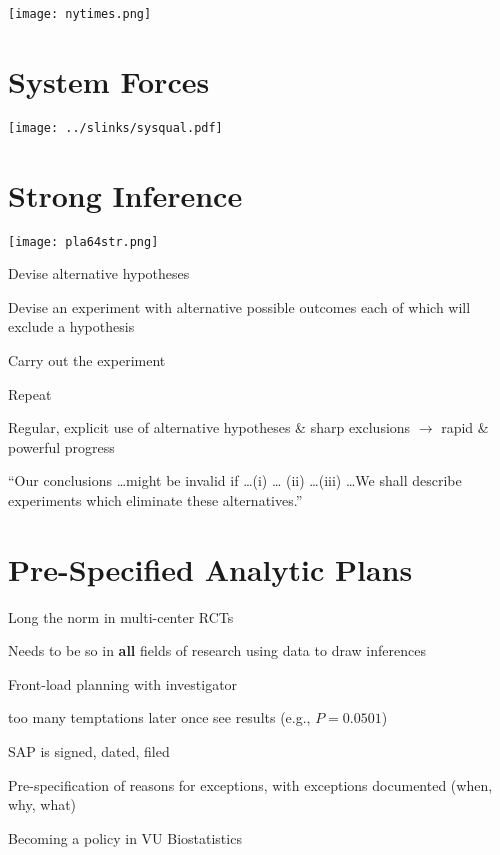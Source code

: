 \texttt{[image: nytimes.png]}

\section{System Forces}
\texttt{[image: ../slinks/sysqual.pdf]}

\section{Strong Inference}

\texttt{[image: pla64str.png]}

\citet{pla64str}

\bi
\item Devise alternative hypotheses
\item Devise an experiment with alternative possible outcomes each of
which will exclude a hypothesis
\item Carry out the experiment
\item Repeat
\item Regular, explicit use of alternative hypotheses \& sharp
exclusions $\rightarrow$ rapid \& powerful progress
\item ``Our conclusions \ldots might be invalid if \ldots (i) \ldots
(ii) \ldots (iii) \ldots We shall describe experiments which eliminate
these alternatives.''\cite{pla64str}
\ei


\section{Pre-Specified Analytic Plans}

\bi
\item Long the norm in multi-center RCTs
\item Needs to be so in \textbf{all} fields of research using data to
draw inferences~\cite{rub07des}
\item Front-load planning with investigator
 \bi
 \item too many temptations later once see results (e.g., $P=0.0501$)
 \ei
\item SAP is signed, dated, filed
\item Pre-specification of reasons for exceptions, with exceptions
documented (when, why, what)
\item Becoming a policy in VU Biostatistics
\ei


